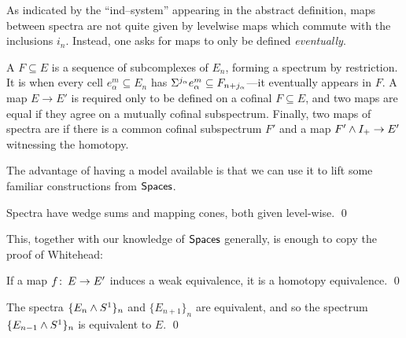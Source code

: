 As indicated by the ``ind--system'' appearing in the abstract definition, maps between spectra are not quite given by levelwise maps which commute with the inclusions $i_n$.%
Instead, one asks for maps to only be defined \emph{eventually}.

\begin{definition}
A  $F \subseteq E$ is a sequence of subcomplexes of $E_n$, forming a spectrum by restriction.
It is  when every cell $e^m_\alpha \subseteq E_n$ has $\Sigma^{j_\alpha} e^m_\alpha \subseteq F_{n+j_\alpha}$---it eventually appears in $F$.
A map $E \to E'$ is required only to be defined on a cofinal $F \subseteq E$, and two maps are equal if they agree on a mutually cofinal subspectrum.%
Finally, two maps of spectra are  if there is a common cofinal subspectrum $F'$ and a map $F' \wedge I_+ \to E'$ witnessing the homotopy.
\end{definition}

The advantage of having a model available is that we can use it to lift some familiar constructions from $\mathsf{Spaces}$.

\begin{lemma}
Spectra have wedge sums and mapping cones, both given level-wise. \qed
\end{lemma}

This, together with our knowledge of $\mathsf{Spaces}$ generally, is enough to copy the proof of Whitehead:

\begin{theorem}
If a map $f\colon\thinspace E \to E'$ induces a weak equivalence, it is a homotopy equivalence. \qed
\end{theorem}

\begin{corollary}
The spectra $\{E_n \wedge S^1\}_n$ and $\{E_{n+1}\}_n$ are equivalent, and so the spectrum $\{E_{n-1} \wedge S^1\}_n$ is equivalent to $E$. \qed
\end{corollary}

